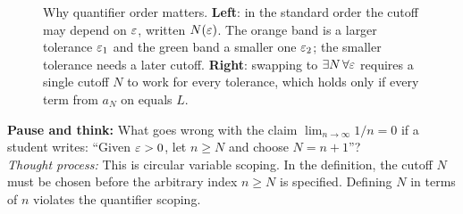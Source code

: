 \begin{figure}[htbp]
\caption{Why quantifier order matters. \textbf{Left}: in the standard order the cutoff may depend on $\varepsilon$, written $N(\varepsilon)$. The orange band is a larger tolerance $\varepsilon_1$ and the green band a smaller one $\varepsilon_2$; the smaller tolerance needs a later cutoff. \textbf{Right}: swapping to $\exists N \, \forall \varepsilon$ requires a single cutoff $N$ to work for every tolerance, which holds only if every term from $a_N$ on equals $L$.}\label{20:fig-quantifier-order}
\end{figure}

\begin{recoverybox}
\textbf{Pause and think:} What goes wrong with the claim $\lim_{n \to \infty} 1/n = 0$ if a student writes: ``Given $\varepsilon > 0$, let $n \ge N$ and choose $N = n + 1$''?
\\[0.4em]
\emph{Thought process:} This is circular variable scoping. In the definition, the cutoff $N$ must be chosen before the arbitrary index $n \ge N$ is specified. Defining $N$ in terms of $n$ violates the quantifier scoping.
\end{recoverybox}

